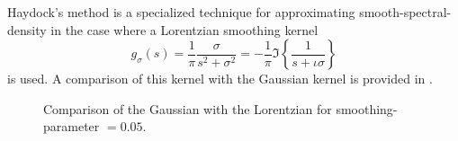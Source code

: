 Haydock's method \cite{haydock1972electronic,lin2016review} is a specialized technique for approximating \gls{smooth-spectral-density}
in the case where a Lorentzian smoothing kernel
\begin{equation}
    g_{\sigma}(s) = \frac{1}{\pi} \frac{\sigma}{s^2 + \sigma^2} = -\frac{1}{\pi} \Im\left\{ \frac{1}{s + \iota \sigma} \right\}
    \label{equ:5-experiments-cauchy-kernel}
\end{equation}
is used. A comparison of this kernel with the Gaussian kernel 
is provided in .\\
\begin{figure}[ht]
    \centering
    
    \caption{Comparison of the Gaussian with the Lorentzian 
        for \gls{smoothing-parameter} $=0.05$.}
    \label{fig:5-experiments-haydock-kernel}
\end{figure}

